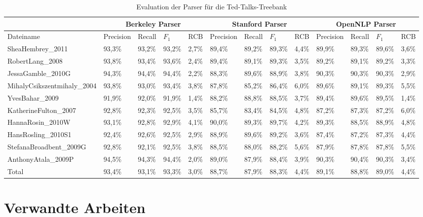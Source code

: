 \begin{sidewaystable}

\begin{tabular}{ | l || l | l | l | l || l | l | l | l || l | l | l | l |}
	\hline
	& \multicolumn{4}{|c||}{Berkeley Parser} & \multicolumn{4}{|c||}{Stanford Parser} & \multicolumn{4}{|c|}{OpenNLP Parser}\\ \hline
	Dateiname & Precision & Recall & \( F_1 \) & RCB & Precision & Recall & \( F_1 \) & RCB & Precision & Recall & \( F_1 \) & RCB  \\
	\hline \hline
	SheaHembrey\_2011 & 93,3\%  & 93,2\% & 93,2\% & 2,7\% & 89,4\% & 89,2\% & 89,3\% & 4,4\% & 89,9\% & 89,3\% & 89,6\% & 3,6\%\\ \hline
	RobertLang\_2008 & 93,8\% & 93,4\% & 93,6\% & 2,4\% & 89,4\% & 89,1\% & 89,3\% & 3,5\% & 89,2\% & 89,1\% & 89,2\% & 3,3\% \\ \hline
	JessaGamble\_2010G & 94,3\% & 94,4\% & 94,4\% & 2,2\% & 88,3\% & 89,6\% & 88,9\% & 3,8\% & 90,3\% & 90,3\% & 90,3\% & 2,9\% \\ \hline
	MihalyCsikszentmihaly\_2004 & 93,8\% & 93,0\% & 93,4\% & 3,8\% & 87,8\% & 85,2\% & 86,4\% & 6,0\% & 89,6\% & 89,1\% & 89,3\% & 5,5\% \\ \hline
	YvesBahar\_2009 & 91,9\% & 92,0\% & 91,9\% & 1,4\% & 88,2\% & 88,8\% & 88,5\% & 3,7\% & 89,4\% & 89,6\% & 89,5\% & 1,4\% \\ \hline
	KatherineFulton\_2007 & 92,8\% & 92,3\% & 92,5\% & 3,5\% & 85,7\% & 83,4\% & 84,5\% & 4,8\% & 87,2\% & 87,3\% & 87,2\% & 6,0\% \\ \hline
	HannaRosin\_2010W & 93,1\% & 92,8\% & 92,9\% & 4,1\% & 90,0\% & 89,3\% & 89,7\% & 4,2\% & 89,3\% & 88,5\% & 88,9\% & 4,8\% \\ \hline
	HansRosling\_2010S1 & 92,4\% & 92,6\% & 92,5\% & 2,9\% & 88,9\% & 89,6\% & 89,2\% & 3,6\% & 87,4\% & 87,2\% & 87,3\% & 4,4\% \\ \hline
	StefanaBroadbent\_2009G & 92,8\% & 92,1\% & 92,5\% & 3,8\% & 88,5\% & 88,0\% & 88,2\% & 5,6\% & 87,9\% & 87,8\% & 87,8\% & 5,5\% \\ \hline
	AnthonyAtala\_2009P & 94,5\% & 94,3\% & 94,4\% & 2,0\% & 89,0\% & 87,9\% & 88,4\% & 3,9\% & 90,3\% & 90,4\% & 90,3\% & 3,4\% \\ \hline \hline
	Total & 93,4\% & 93,1\% & 93,3\% & 3,0\% & 88,7\% & 87,9\% & 88,3\% & 4,4\% & 89,1\% & 88,8\% & 89,0\% & 4,4\% \\ \hline
\end{tabular}
\caption{Evaluation der Parser für die Ted-Talks-Treebank} 
\label{tab:eval-parser}
\end{sidewaystable} 

\section{Verwandte Arbeiten}

